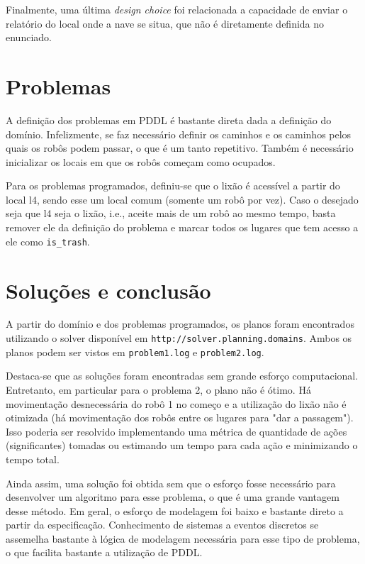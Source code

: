 \documentclass[a4paper]{report}
\begin{document}
Finalmente, uma última \emph{design choice} foi relacionada a capacidade de enviar o relatório do local onde a nave se situa, que não é diretamente definida no enunciado.

\section*{Problemas}

A definição dos problemas em PDDL é bastante direta dada a definição do domínio. Infelizmente, se faz necessário definir os caminhos e os caminhos pelos quais os robôs podem passar, o que é um tanto repetitivo. Também é necessário inicializar os locais em que os robôs começam como ocupados.

Para os problemas programados, definiu-se que o lixão é acessível a partir do local l4, sendo esse um local comum (somente um robô por vez). Caso o desejado seja que l4 seja o lixão, i.e., aceite mais de um robô ao mesmo tempo, basta remover ele da definição do problema e marcar todos os lugares que tem acesso a ele como \texttt{is\_trash}.

\section*{Soluções e conclusão}

A partir do domínio e dos problemas programados, os planos foram encontrados utilizando o solver disponível em \texttt{http://solver.planning.domains}. Ambos os planos podem ser vistos em \texttt{problem1.log} e \texttt{problem2.log}.

Destaca-se que as soluções foram encontradas sem grande esforço computacional. Entretanto, em particular para o problema 2, o plano não é ótimo. Há movimentação desnecessária do robô 1 no começo e a utilização do lixão não é otimizada (há movimentação dos robôs entre os lugares para "dar a passagem"). Isso poderia ser resolvido implementando uma métrica de quantidade de ações (significantes) tomadas ou estimando um tempo para cada ação e minimizando o tempo total.

Ainda assim, uma solução foi obtida sem que o esforço fosse necessário para desenvolver um algoritmo para esse problema, o que é uma grande vantagem desse método. Em geral, o esforço de modelagem foi baixo e bastante direto a partir da especificação. Conhecimento de sistemas a eventos discretos se assemelha bastante à lógica de modelagem necessária para esse tipo de problema, o que facilita bastante a utilização de PDDL.
\end{document}
